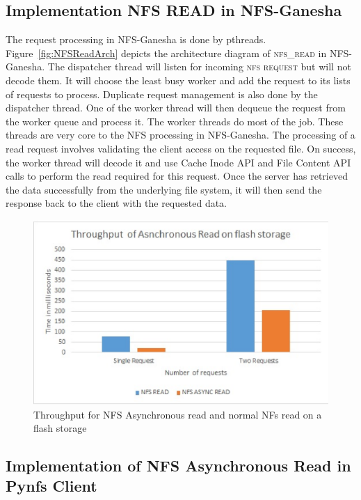 \subsection{Implementation NFS READ in NFS-Ganesha}

 The request processing in NFS-Ganesha is done by pthreads. Figure~\ref{fig:NFSReadArch} depicts the architecture diagram of \textsc{nfs\_read} in NFS-Ganesha. The dispatcher thread will listen for incoming \textsc{nfs request} but will not decode them. It will choose the least busy worker and add the request to its lists of requests to process. Duplicate request management is also done by the dispatcher thread. One of the worker thread will then dequeue the request from the worker queue and process it. The worker threads do most of the job. These threads are very core to the NFS processing in NFS-Ganesha. The processing of a read request involves validating the client access on the requested file. On success, the worker thread will decode it and use Cache Inode API and File Content API calls to perform the read required for this request. Once the server has retrieved the data successfully from the underlying file system, it will then send the response back to the client with the requested data.
 
\begin{figure}
\centering
\includegraphics[scale=1.0]{figures/Throughput.eps}
\caption{Throughput for NFS Asynchronous read and normal NFs read on a flash storage}
\label{fig:NFSThroughput}
\end{figure}

 
 
\subsection{Implementation of NFS Asynchronous Read in Pynfs Client}
 
